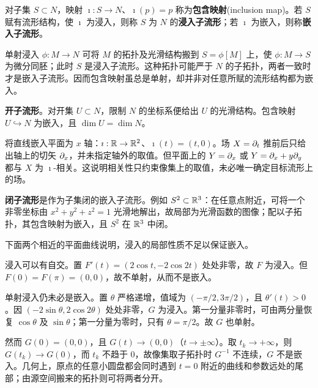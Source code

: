 \begin{definition}
    对子集 $S\subset N$，映射 $\imath:S\to N$、$\imath(p)=p$ 称为\textbf{包含映射}(inclusion map)。若 $S$ 赋有流形结构，使 $\imath$ 为浸入，则称 $S$ 为 $N$ 的\textbf{浸入子流形}；若 $\imath$ 为嵌入，则称\textbf{嵌入子流形}。
\end{definition}

单射浸入 $\phi:M\to N$ 可将 $M$ 的拓扑及光滑结构搬到 $S=\phi[M]$ 上，使 $\phi:M\to S$ 为微分同胚；此时 $S$ 是浸入子流形。这种拓扑可能严于 $N$ 的子拓扑，两者一致时才是嵌入子流形。因而包含映射虽总是单射，却并非对任意所赋的流形结构都为嵌入。

\begin{example}
    \textbf{开子流形}。对开集 $U\subset N$，限制 $N$ 的坐标系便给出 $U$ 的光滑结构。包含映射 $U\hookrightarrow N$ 为嵌入，且 $\dim U=\dim N$。
\end{example}

\begin{example}
    将直线嵌入平面为 $x$ 轴：$\imath:\mathbb{R}\to\mathbb{R}^2$、$\imath(t)=(t,0)$。场 $X=\partial_t$ 推前后只给出轴上的切矢 $\partial_x$，并未指定轴外的取值。但平面上的 $Y=\partial_x$ 或 $Y=\partial_x+y\partial_y$ 都与 $X$ 为 $\imath$-相关。这说明相关性只约束像集上的取值，未必唯一确定目标流形上的场。
\end{example}

\begin{example}
    \textbf{闭子流形}是作为子集闭的嵌入子流形。例如 $S^2\subset\mathbb{R}^3$：在任意点附近，可将一个非零坐标由 $x^2+y^2+z^2=1$ 光滑地解出，故局部为光滑函数的图像；配以子拓扑，其包含映射为嵌入，且 $S^2$ 在 $\mathbb{R}^3$ 中闭。
\end{example}

下面两个相近的平面曲线说明，浸入的局部性质不足以保证嵌入。
\begin{example}\label{chdm:exm_iec1}
    浸入可以有自交。置
    $F'(t)=(2\cos t,-2\cos2t)$ 处处非零，故 $F$ 为浸入。但 $F(0)=F(\pi)=(0,0)$，故不单射，从而不是嵌入。
\end{example}

\begin{example}\label{chdm:exm_iec2}
    单射浸入仍未必是嵌入。置
    $\theta$ 严格递增，值域为 $(-\pi/2,3\pi/2)$，且 $\theta'(t)>0$。因 $(-2\sin\theta,2\cos2\theta)$ 处处非零，$G$ 为浸入。第一分量非零时，可由两分量恢复 $\cos\theta$ 及 $\sin\theta$；第一分量为零时，只有 $\theta=\pi/2$。故 $G$ 也单射。

    然而 $G(0)=(0,0)$，且 $G(t)\to(0,0)$（$t\to\pm\infty$）。取 $t_k\to+\infty$，则 $G(t_k)\to G(0)$，而 $t_k$ 不趋于 $0$，故像集取子拓扑时 $G^{-1}$ 不连续，$G$ 不是嵌入。几何上，原点的任意小圆盘都会同时遇到 $t=0$ 附近的曲线和参数远处的尾部；由源空间搬来的拓扑则可将两者分开。
\end{example}

